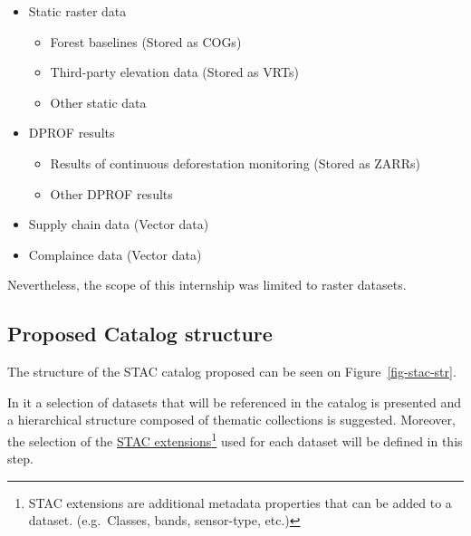 \documentclass[
  oneside,
  open=any]{scrbook}
\providecommand{\tightlist}{%
  \setlength{\itemsep}{0pt}\setlength{\parskip}{0pt}}\usepackage{longtable,booktabs,array}
\begin{document}
\begin{itemize}
\tightlist
\item
  Static raster data

  \begin{itemize}
  \tightlist
  \item
    Forest baselines (Stored as COGs)
  \item
    Third-party elevation data (Stored as VRTs)
  \item
    Other static data
  \end{itemize}
\item
  DPROF results

  \begin{itemize}
  \tightlist
  \item
    Results of continuous deforestation monitoring (Stored as ZARRs)
  \item
    Other DPROF results
  \end{itemize}
\item
  Supply chain data (Vector data)
\item
  Complaince data (Vector data)
\end{itemize}

Nevertheless, the scope of this internship was limited to raster
datasets.

\subsection{Proposed Catalog
structure}\label{proposed-catalog-structure}

The structure of the STAC catalog proposed can be seen on
Figure~\ref{fig-stac-str}.

In it a selection of datasets that will be referenced in the catalog is
presented and a hierarchical structure composed of thematic collections
is suggested. Moreover, the selection of the
\href{https://stac-extensions.github.io/}{STAC extensions}\footnote{STAC
  extensions are additional metadata properties that can be added to a
  dataset. (e.g.~Classes, bands, sensor-type, etc.)} used for each
dataset will be defined in this step.
\end{document}
